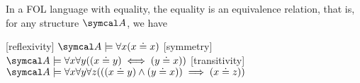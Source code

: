 \begin{proposition}\label{thm:first_order_equality_equivalence_relation}
  In a FOL language with equality, the equality is an equivalence relation, that is, for any structure \( \Cal{A} \), we have
  \begin{description}
    [reflexivity] \( \Cal{A} \models \forall x (x \doteq x) \)
    [symmetry] \( \Cal{A} \models \forall x \forall y ((x \doteq y) \iff (y \doteq x)) \)
    [transitivity] \( \Cal{A} \models \forall x \forall y \forall z (((x \doteq y) \land (y \doteq x)) \implies (x \doteq z)) \)
  \end{description}
\end{proposition}
